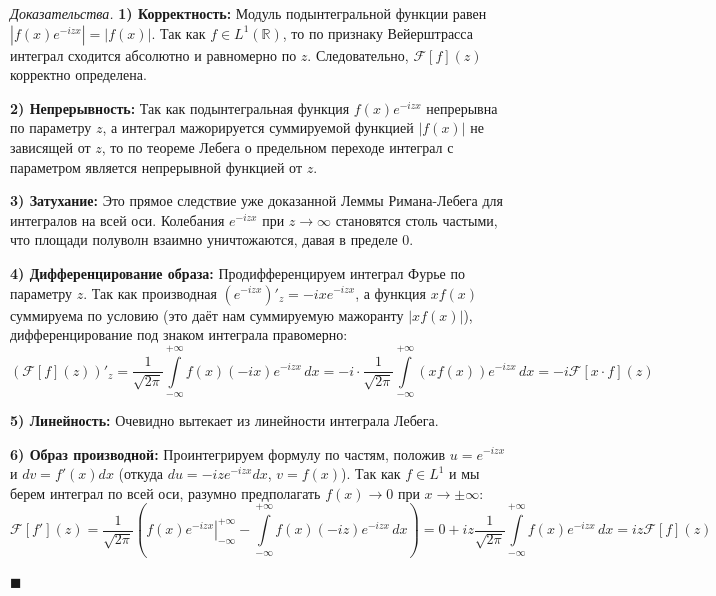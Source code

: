 \documentclass[12pt,a4paper]{article}
\newenvironment{Proof}[1][Доказательство]{\vspace{0.5em}\noindent\textit{#1.}\hspace{0.5em}\ignorespaces}{\hfill$\blacksquare$\vspace{1em}}
\begin{document}
\begin{Proof}[Доказательства]
\textbf{1) Корректность:} Модуль подынтегральной функции равен $|f(x) e^{-izx}| = |f(x)|$. Так как $f \in L^1(\mathbb{R})$, то по признаку Вейерштрасса интеграл сходится абсолютно и равномерно по $z$. Следовательно, $\mathcal{F}[f](z)$ корректно определена.

\textbf{2) Непрерывность:} Так как подынтегральная функция $f(x)e^{-izx}$ непрерывна по параметру $z$, а интеграл мажорируется суммируемой функцией $|f(x)|$ не зависящей от $z$, то по теореме Лебега о предельном переходе интеграл с параметром является непрерывной функцией от $z$.

\textbf{3) Затухание:} Это прямое следствие уже доказанной Леммы Римана-Лебега для интегралов на всей оси. Колебания $e^{-izx}$ при $z \to \infty$ становятся столь частыми, что площади полуволн взаимно уничтожаются, давая в пределе 0.

\textbf{4) Дифференцирование образа:} Продифференцируем интеграл Фурье по параметру $z$. Так как производная $\left(e^{-izx}\right)'_z = -ix e^{-izx}$, а функция $x f(x)$ суммируема по условию (это даёт нам суммируемую мажоранту $|xf(x)|$), дифференцирование под знаком интеграла правомерно:
$$ \left( \mathcal{F}[f](z) \right)'_z = \frac{1}{\sqrt{2\pi}} \int\limits_{-\infty}^{+\infty} f(x) (-ix) e^{-i z x} \, dx = -i \cdot \frac{1}{\sqrt{2\pi}} \int\limits_{-\infty}^{+\infty} (x f(x)) e^{-i z x} \, dx = -i \mathcal{F}[x \cdot f](z) $$

\textbf{5) Линейность:} Очевидно вытекает из линейности интеграла Лебега.

\textbf{6) Образ производной:} Проинтегрируем формулу по частям, положив $u = e^{-izx}$ и $dv = f'(x) dx$ (откуда $du = -iz e^{-izx} dx$, $v = f(x)$). Так как $f \in L^1$ и мы берем интеграл по всей оси, разумно предполагать $f(x) \to 0$ при $x \to \pm\infty$:
$$ \mathcal{F}[f'](z) = \frac{1}{\sqrt{2\pi}} \left( \left. f(x) e^{-izx} \right|_{-\infty}^{+\infty} - \int\limits_{-\infty}^{+\infty} f(x) (-iz) e^{-izx} \, dx \right) = 0 + iz \frac{1}{\sqrt{2\pi}} \int\limits_{-\infty}^{+\infty} f(x) e^{-izx} \, dx = iz \mathcal{F}[f](z) $$


\end{Proof}
\end{document}

